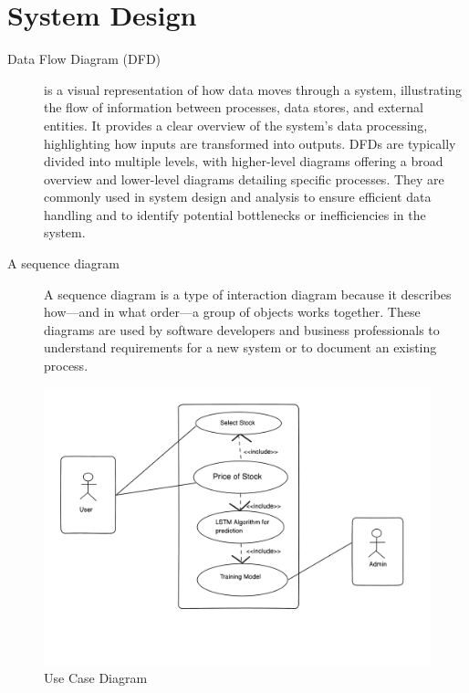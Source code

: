\section{System Design}
\begin{description}
    \item[Data Flow Diagram (DFD)] is a visual representation of how data moves through a system, illustrating the flow of information between processes, data stores, and external entities. It provides a clear overview of the system's data processing, highlighting how inputs are transformed into outputs. DFDs are typically divided into multiple levels, with higher-level diagrams offering a broad overview and lower-level diagrams detailing specific processes. They are commonly used in system design and analysis to ensure efficient data handling and to identify potential bottlenecks or inefficiencies in the system.
    \item [A sequence diagram]A sequence diagram is a type of interaction diagram because it describes how—and in what order—a group of objects works together. These diagrams are used by software developers and business professionals to understand requirements for a new system or to document an existing process.
\end{description}
\begin{figure}[h]
    \centering
    \includegraphics[width=1\textwidth]{Graphics/use_case.png}  
    \caption{Use Case Diagram}
    \label{fig:example}  
\end{figure}
